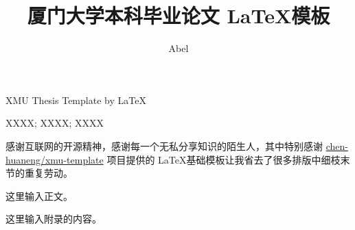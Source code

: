 \documentclass{xmu}
\begin{document}
\print




\title{厦门大学本科毕业论文 \LaTeX 模板}
{XMU Thesis Template by \LaTeX}

\author{Abel}



\subject{XXXX}





{XXXX; XXXX; XXXX}


\maketitle


\begin{acknowledgement}
感谢互联网的开源精神，感谢每一个无私分享知识的陌生人，其中特别感谢 \href{https://github.com/chen-huaneng/xmu-template}{chen-huaneng/xmu-template} 项目提供的 \LaTeX 基础模板让我省去了很多排版中细枝末节的重复劳动。

\end{acknowledgement}


\begin{abstract}

\end{abstract}

\begin{enabstract}

\end{enabstract}


\tableofcontents

这里输入正文。


\begin{reference}
\end{reference}

\begin{appendix}
这里输入附录的内容。

\end{appendix}
\end{document}

